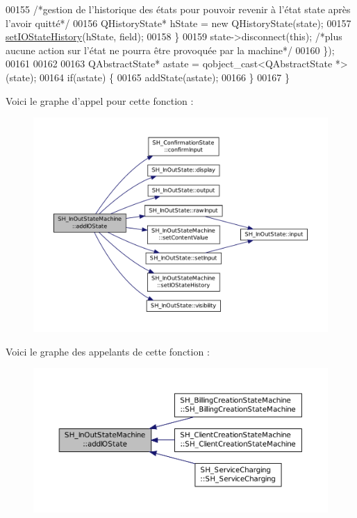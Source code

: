 \begin{DoxyCode}
00155             \textcolor{comment}{/*gestion de l'historique des états pour pouvoir revenir à l'état state après l'avoir quitté*/}
00156             QHistoryState* hState = \textcolor{keyword}{new} QHistoryState(state);
00157             \hyperlink{classSH__InOutStateMachine_a4b72e6da839782a211692a4d728c3925}{setIOStateHistory}(hState, field);
00158         \}
00159         state->disconnect(\textcolor{keyword}{this}); \textcolor{comment}{/*plus aucune action sur l'état ne pourra être provoquée par la machine*/}
00160     \});
00161 
00162 
00163     QAbstractState* astate = qobject\_cast<QAbstractState *>(state);
00164     \textcolor{keywordflow}{if}(astate) \{
00165         addState(astate);
00166     \}
00167 \}
\end{DoxyCode}


Voici le graphe d'appel pour cette fonction \-:
\nopagebreak
\begin{figure}[H]
\begin{center}
\leavevmode
\includegraphics[width=350pt]{classSH__InOutStateMachine_ad6b778d052f741daee720c047059ce0e_cgraph}
\end{center}
\end{figure}




Voici le graphe des appelants de cette fonction \-:
\nopagebreak
\begin{figure}[H]
\begin{center}
\leavevmode
\includegraphics[width=350pt]{classSH__InOutStateMachine_ad6b778d052f741daee720c047059ce0e_icgraph}
\end{center}
\end{figure}


